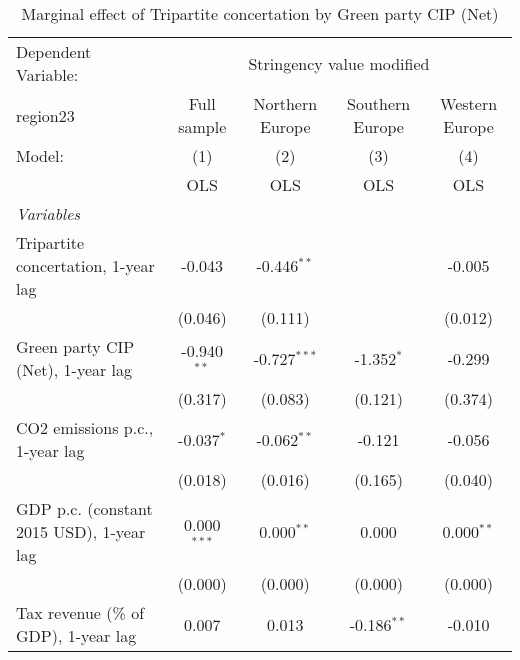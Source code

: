 
\begin{table}[htbp]
   \caption{Marginal effect of Tripartite concertation by Green party CIP (Net)}
   \centering
   \begin{tabular}{lcccc}
      \toprule
      Dependent Variable: & \multicolumn{4}{c}{Stringency value modified}\\
      region23                                                                & Full sample   & Northern Europe & Southern Europe & Western Europe \\   
      Model:                                                                  & (1)           & (2)             & (3)             & (4)\\  
                                                                              &  OLS          & OLS             & OLS             & OLS\\  
      \midrule
      \emph{Variables}\\
      Tripartite concertation, 1-year lag                                     & -0.043        & -0.446$^{**}$   &                 & -0.005\\   
                                                                              & (0.046)       & (0.111)         &                 & (0.012)\\   
      Green party CIP (Net), 1-year lag                                       & -0.940$^{**}$ & -0.727$^{***}$  & -1.352$^{*}$    & -0.299\\   
                                                                              & (0.317)       & (0.083)         & (0.121)         & (0.374)\\   
      CO2 emissions p.c., 1-year lag                                          & -0.037$^{*}$  & -0.062$^{**}$   & -0.121          & -0.056\\   
                                                                              & (0.018)       & (0.016)         & (0.165)         & (0.040)\\   
      GDP p.c. (constant 2015 USD), 1-year lag                                & 0.000$^{***}$ & 0.000$^{**}$    & 0.000           & 0.000$^{**}$\\   
                                                                              & (0.000)       & (0.000)         & (0.000)         & (0.000)\\   
      Tax revenue (\% of GDP), 1-year lag                                     & 0.007         & 0.013           & -0.186$^{**}$   & -0.010\\   

\end{tabular}
\end{table}
